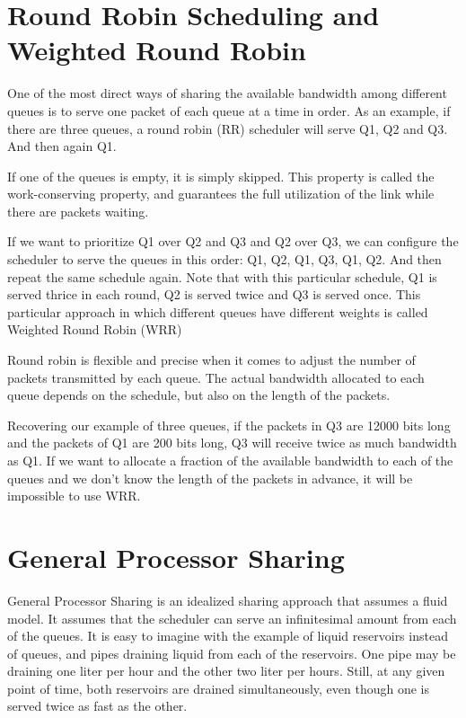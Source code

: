 \section{Round Robin Scheduling and Weighted Round Robin}

One of the most direct ways of sharing the available bandwidth among different queues is to serve one packet of each queue at a time in order.
As an example, if there are three queues, a round robin (RR) scheduler will serve Q1, Q2 and Q3.
And then again Q1.

If one of the queues is empty, it is simply skipped.
This property is called the work-conserving property, and guarantees the full utilization of the link while there are packets waiting.

If we want to prioritize Q1 over Q2 and Q3 and Q2 over Q3, we can configure the scheduler to serve the queues in this order: Q1, Q2, Q1, Q3, Q1, Q2.
And then repeat the same schedule again.
Note that with this particular schedule, Q1 is served thrice in each round, Q2 is served twice and Q3 is served once.
This particular approach in which different queues have different weights is called Weighted Round Robin (WRR)

Round robin is flexible and precise when it comes to adjust the number of packets transmitted by each queue.
The actual bandwidth allocated to each queue depends on the schedule, but also on the length of the packets.

Recovering our example of three queues, if the packets in Q3 are 12000 bits long and the packets of Q1 are 200 bits long, Q3 will receive twice as much bandwidth as Q1.
If we want to allocate a fraction of the available bandwidth to each of the queues and we don't know the length of the packets in advance, it will be impossible to use WRR.

\section{General Processor Sharing}

General Processor Sharing is an idealized sharing approach that assumes a fluid model.
It assumes that the scheduler can serve an infinitesimal amount from each of the queues.
It is easy to imagine with the example of liquid reservoirs instead of queues, and pipes draining liquid from each of the reservoirs.
One pipe may be draining one liter per hour and the other two liter per hours.
Still, at any given point of time, both reservoirs are drained simultaneously, even though one is served twice as fast as the other.

